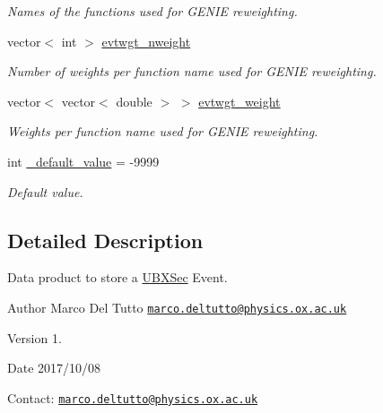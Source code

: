 \begin{DoxyCompactItemize}
\begin{DoxyCompactList}\small\item\em Names of the functions used for G\-E\-N\-I\-E reweighting. \end{DoxyCompactList}\item 
\hypertarget{classUBXSecEvent_aac72a61a5056b4c435590ac5e4b34d67}{vector$<$ int $>$ \hyperlink{classUBXSecEvent_aac72a61a5056b4c435590ac5e4b34d67}{evtwgt\-\_\-nweight}}\label{classUBXSecEvent_aac72a61a5056b4c435590ac5e4b34d67}

\begin{DoxyCompactList}\small\item\em Number of weights per function name used for G\-E\-N\-I\-E reweighting. \end{DoxyCompactList}\item 
\hypertarget{classUBXSecEvent_a983692b076ec8a489d225698150e8371}{vector$<$ vector$<$ double $>$ $>$ \hyperlink{classUBXSecEvent_a983692b076ec8a489d225698150e8371}{evtwgt\-\_\-weight}}\label{classUBXSecEvent_a983692b076ec8a489d225698150e8371}

\begin{DoxyCompactList}\small\item\em Weights per function name used for G\-E\-N\-I\-E reweighting. \end{DoxyCompactList}\item 
\hypertarget{classUBXSecEvent_a88e5ff2c7d0db95750e980740231d80b}{int \hyperlink{classUBXSecEvent_a88e5ff2c7d0db95750e980740231d80b}{\-\_\-default\-\_\-value} = -\/9999}\label{classUBXSecEvent_a88e5ff2c7d0db95750e980740231d80b}

\begin{DoxyCompactList}\small\item\em Default value. \end{DoxyCompactList}\end{DoxyCompactItemize}


\subsection{Detailed Description}
Data product to store a \hyperlink{classUBXSec}{U\-B\-X\-Sec} Event. 

\begin{DoxyAuthor}{Author}
Marco Del Tutto \href{mailto:marco.deltutto@physics.ox.ac.uk}{\tt marco.\-deltutto@physics.\-ox.\-ac.\-uk}
\end{DoxyAuthor}
\begin{DoxyVersion}{Version}
1.
\end{DoxyVersion}
\begin{DoxyDate}{Date}
2017/10/08
\end{DoxyDate}
Contact\-: \href{mailto:marco.deltutto@physics.ox.ac.uk}{\tt marco.\-deltutto@physics.\-ox.\-ac.\-uk}

